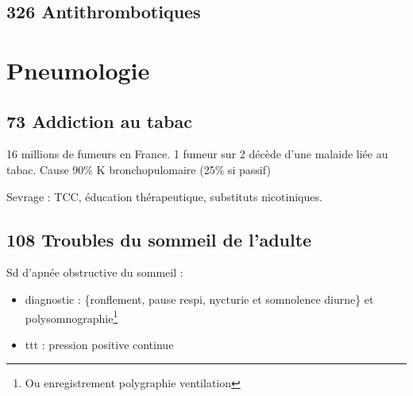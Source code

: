\documentclass[11pt]{article}
\begin{document}
\subsection{326 Antithrombotiques}
\label{sec:org1a7af3e}
\begin{table}
\caption{Antithrombotiques}
\centering
{}
\end{table}

\section{Pneumologie}
\label{sec:org60a8ad8}
\subsection{73 Addiction au tabac}
\label{sec:org987c7a2}
16 millions de fumeurs en France. 1 fumeur sur 2 décède d'une malaide liée au
tabac.
Cause 90\% K bronchopulomaire (25\% si passif)

Sevrage : TCC, éducation thérapeutique, substituts nicotiniques.
\subsection{108 Troubles du sommeil de l'adulte}
\label{sec:org9bfdbee}
Sd d'apnée obstructive du sommeil : 
\begin{itemize}
\item diagnostic : \{ronflement, pause respi, nycturie et somnolence diurne\} et
polysomnographie\footnote{Ou enregistrement polygraphie ventilation}
\item ttt : pression positive continue
\end{itemize}
\end{document}
